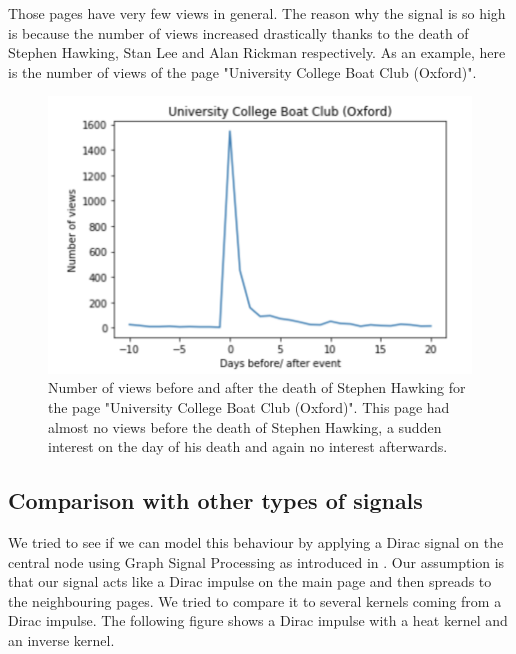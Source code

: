 \documentclass[conference]{IEEEtran}
\begin{document}
\medskip
Those pages have very few views in general. The reason why the signal is so high is because the number of views increased drastically thanks to the death of Stephen Hawking, Stan Lee and Alan Rickman respectively. As an example, here is the number of views of the page "University College Boat Club (Oxford)". 

\begin{figure}[!htb]
  \includegraphics[width=\linewidth]{uniboat.png}
\caption{Number of views before and after the death of Stephen Hawking for the page "University College Boat Club (Oxford)". This page had almost no views before the death of Stephen Hawking, a sudden interest on the day of his death and again no interest afterwards.}
\end{figure}

\subsection{Comparison with other types of signals}

We tried to see if we can model this behaviour by applying a Dirac signal on the central node using Graph Signal Processing as introduced in \cite{signalprocessing}.
Our assumption is that our signal acts like a Dirac impulse on the main page and then spreads to the neighbouring pages. We tried to compare it to several kernels coming from a Dirac impulse. The following figure shows a Dirac impulse with a heat kernel and an inverse kernel. 
\end{document}
